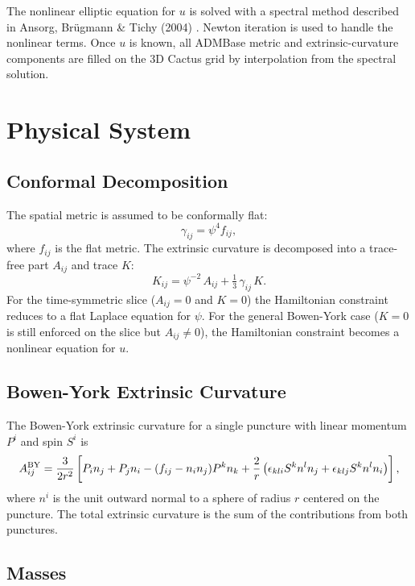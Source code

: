 The nonlinear elliptic equation for $u$ is solved with a spectral method
described in Ansorg, Br\"ugmann \& Tichy (2004)
\cite{einsteininitialdata_TwoPunctures_Ansorg04}.  Newton iteration is used
to handle the nonlinear terms.  Once $u$ is known, all ADMBase metric and
extrinsic-curvature components are filled on the 3D Cactus grid by
interpolation from the spectral solution.

\section{Physical System}

\subsection{Conformal Decomposition}

The spatial metric is assumed to be conformally flat:
\begin{equation}
  \gamma_{ij} = \psi^4 f_{ij},
\end{equation}
where $f_{ij}$ is the flat metric.  The extrinsic curvature is decomposed into
a trace-free part $A_{ij}$ and trace $K$:
\begin{equation}
  K_{ij} = \psi^{-2}\,A_{ij} + \tfrac{1}{3}\,\gamma_{ij}\,K.
\end{equation}
For the time-symmetric slice ($A_{ij}=0$ and $K=0$) the Hamiltonian constraint reduces to a
flat Laplace equation for $\psi$.  For the general Bowen-York case ($K=0$ is
still enforced on the slice but $A_{ij}\neq 0$), the Hamiltonian constraint
becomes a nonlinear equation for $u$.

\subsection{Bowen-York Extrinsic Curvature}

The Bowen-York extrinsic curvature for a single puncture with linear momentum
$P^i$ and spin $S^i$ is
\begin{equation}
  A_{ij}^{\rm BY} = \frac{3}{2r^2}\left[
    P_i n_j + P_j n_i - (f_{ij} - n_i n_j) P^k n_k
    + \frac{2}{r}\left(\epsilon_{kli} S^k n^l n_j
      + \epsilon_{klj} S^k n^l n_i\right)
  \right],
\end{equation}
where $n^i$ is the unit outward normal to a sphere of radius $r$ centered on
the puncture.  The total extrinsic curvature is the sum of the contributions
from both punctures.

\subsection{Masses}

